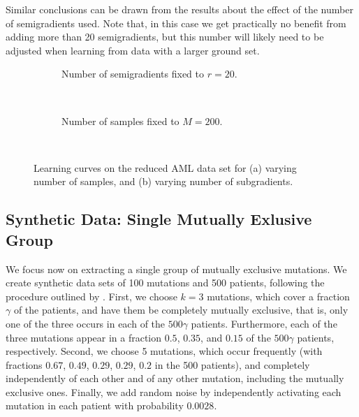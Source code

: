 Similar conclusions can be drawn from the results  about the effect of the number of semigradients used.
Note that, in this case we get practically no benefit from adding more than 20 semigradients, but this number will likely need to be adjusted when learning from data with a larger ground set.

\setlength{}
\setlength{}
\renewcommand{\subflen}{\textwidth}
\renewcommand{\scspacey}{-0.3em}
\renewcommand{\scspacex}{0.2em}
\begin{figure}[htbp]
  \centering
  \begin{subfigure}[b]{\subflen}
    \centering
    
    \caption{Number of semigradients fixed to $r = 20$.}
    \label{fig:syn_nsamples}
  \end{subfigure}\\[2em]
  \begin{subfigure}[b]{\subflen}
    \centering
    
    \caption{Number of samples fixed to $M = 200$.}
    \label{fig:syn_nsubg}
  \end{subfigure}\\[1em]
  \caption{
    Learning curves on the reduced AML data set for (a) varying number of samples, and (b) varying number of subgradients.
  }
  \label{fig:syn1}
\end{figure}

\subsection{Synthetic Data: Single Mutually Exlusive Group}
We focus now on extracting a single group of mutually exclusive mutations.
We create synthetic data sets of 100 mutations and 500 patients, following the procedure outlined by \cite{comet}.
First, we choose $k = 3$ mutations, which cover a fraction $\gamma$ of the patients, and have them be completely mutually exclusive, that is, only one of the three occurs in each of the $500\gamma$ patients.
Furthermore, each of the three mutations appear in a fraction $0.5$, $0.35$, and $0.15$ of the $500\gamma$ patients, respectively.
Second, we choose 5 mutations, which occur frequently (with fractions $0.67$, $0.49$, $0.29$, $0.29$, $0.2$ in the 500 patients), and completely independently of each other and of any other mutation, including the mutually exclusive ones.
Finally, we add random noise by independently activating each mutation in each patient with probability $0.0028$.

